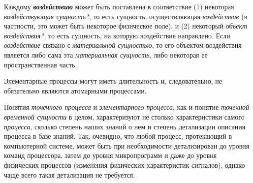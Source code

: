 \begin{SCn}
\end{SCn}

Каждому \textbf{\textit{воздействию}} может быть поставлена в соответствие (1) некоторая \textit{воздействующая сущность*}, то есть сущность, осуществляющая \textit{воздействие} (в частности, это может быть некоторое физическое поле), и (2) некоторый \textit{объект воздействия*}, то есть сущность, на которую воздействие направлено. Если \textit{воздействие} связано с \textit{материальной сущностью}, то его объектом воздействия является либо сама эта \textit{материальная сущность}, либо некоторая ее пространственная часть.


\begin{SCn}
		
\end{SCn}

Элементарные процессы могут иметь длительность и, следовательно, не обязательно являются атомарными процессами.

Понятия \textit{точечного процесса} и \textit{элементарного процесса}, как и понятие \textit{точечной временной сущности} в целом, характеризуют не столько характеристики самого \textit{процесса}, сколько степень наших знаний о нем и степень детализации описания процесса в базе знаний. Так, очевидно, что любой процесс, протекающий в компьютерной системе, может быть при необходимости детализирован до уровня команд процессора, затем до уровня микропрограмм и даже до уровня физических процессов (изменения физических характеристик сигналов), однако чаще всего такая детализация не требуется.

